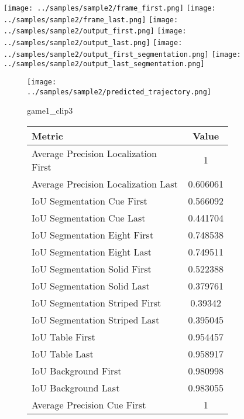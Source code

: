 \begin{figure}
    \texttt{[image: ../samples/sample2/frame\_first.png]}
    \texttt{[image: ../samples/sample2/frame\_last.png]}
    \newline
    \texttt{[image: ../samples/sample2/output\_first.png]}
    \texttt{[image: ../samples/sample2/output\_last.png]}
    \newline
    \texttt{[image: ../samples/sample2/output\_first\_segmentation.png]}
    \texttt{[image: ../samples/sample2/output\_last\_segmentation.png]}
    \newline
    \begin{subfigure}[b]{0.49\textwidth}
        \vspace{20pt}
        \texttt{[image: ../samples/sample2/predicted\_trajectory.png]}
        \caption*{game1\_clip3}
    \end{subfigure}
\begin{subfigure}[b]{0.49\textwidth}
    \begin{tabular}{|l|c|}
        \hline
        \textbf{Metric} & \textbf{Value} \\
        \hline
        Average Precision Localization First & 1 \\
        Average Precision Localization Last & 0.606061 \\
        \hline
        IoU Segmentation Cue First & 0.566092 \\
        IoU Segmentation Cue Last & 0.441704 \\
        IoU Segmentation Eight First & 0.748538 \\
        IoU Segmentation Eight Last & 0.749511 \\
        IoU Segmentation Solid First & 0.522388 \\
        IoU Segmentation Solid Last & 0.379761 \\
        IoU Segmentation Striped First & 0.39342 \\
        IoU Segmentation Striped Last & 0.395045 \\
        \hline
        IoU Table First & 0.954457 \\
        IoU Table Last & 0.958917 \\
        IoU Background First & 0.980998 \\
        IoU Background Last & 0.983055 \\
        \hline
        Average Precision Cue First & 1 \\

\end{tabular}
\end{subfigure}
\end{figure}
